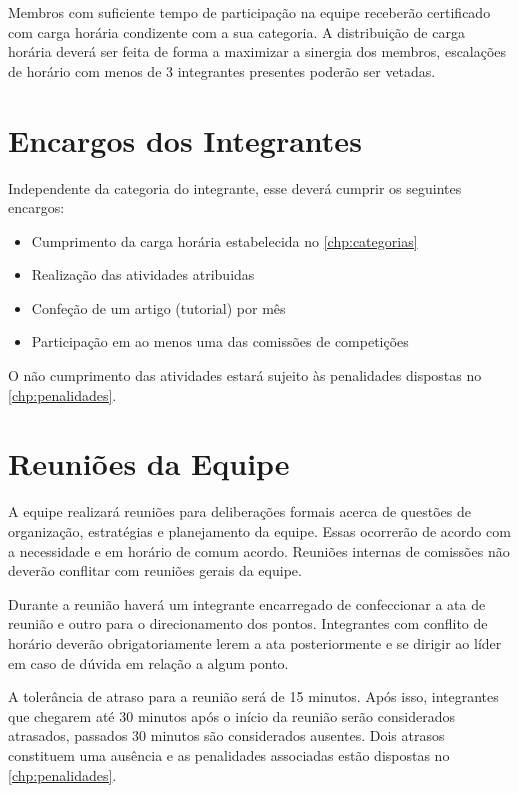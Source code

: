Membros com suficiente tempo de participação na equipe receberão certificado com carga horária condizente com a sua categoria. A distribuição de carga horária deverá ser feita de forma a maximizar a sinergia dos membros, escalações de horário com menos de 3 integrantes presentes poderão ser vetadas.


\chapter{Encargos dos Integrantes}
\label{chp:encargos}

Independente da categoria do integrante, esse deverá cumprir os seguintes encargos:

\begin{itemize}
\item Cumprimento da carga horária estabelecida no \autoref{chp:categorias}
\item Realização das atividades atribuidas
\item Confeção de um artigo (tutorial) por mês
\item Participação em ao menos uma das comissões de competições
\end{itemize}

O não cumprimento das atividades estará sujeito às penalidades dispostas no \autoref{chp:penalidades}.

\chapter{Reuniões da Equipe}
\label{chp:reunioes}

A equipe realizará reuniões para deliberações formais acerca de questões de organização, estratégias e planejamento da equipe. Essas ocorrerão de acordo com a necessidade e em horário de comum acordo. Reuniões internas de comissões não deverão conflitar com reuniões gerais da equipe.

Durante a reunião haverá um integrante encarregado de confeccionar a ata de reunião e outro para o direcionamento dos pontos. Integrantes com conflito de horário deverão obrigatoriamente lerem a ata posteriormente e se dirigir ao líder em caso de dúvida em relação a algum ponto.

A tolerância de atraso para a reunião será de 15 minutos. Após isso, integrantes que chegarem até 30 minutos após o início da reunião serão considerados atrasados, passados 30 minutos são considerados ausentes. Dois atrasos constituem uma ausência e as penalidades associadas estão dispostas no \autoref{chp:penalidades}.


